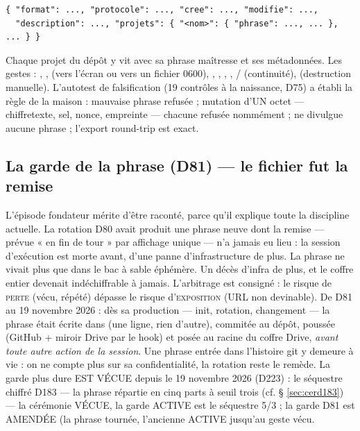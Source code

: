 \begin{lstlisting}
{ "format": ..., "protocole": ..., "cree": ..., "modifie": ...,
  "description": ..., "projets": { "<nom>": { "phrase": ..., ... }, ... } }
\end{lstlisting}

Chaque projet du dépôt y vit avec sa phrase maîtresse et ses métadonnées. Les gestes :
, ,  (vers l'écran ou vers un fichier 0600),
, , , ,
/ (continuité),  (destruction manuelle).
L'autotest de falsification (19 contrôles à la naissance, D75) a établi la règle de la
maison : mauvaise phrase refusée ; mutation d'UN octet — chiffretexte, sel, nonce,
empreinte — chacune refusée nommément ;  ne divulgue aucune phrase ;
l'export round-trip est exact.

\subsection{La garde de la phrase (D81) — le fichier fut la remise}\label{sec:guarded81}

L'épisode fondateur mérite d'être raconté, parce qu'il explique toute la discipline
actuelle. La rotation D80 avait produit une phrase neuve dont la remise — prévue « en
fin de tour » par affichage unique — n'a jamais eu lieu : la session d'exécution est
morte avant, d'une panne d'infrastructure de plus. La phrase ne vivait plus que dans le
bac à sable éphémère. Un décès d'infra de plus, et le coffre entier devenait
indéchiffrable à jamais. L'arbitrage est consigné : le risque de \textsc{perte} (vécu,
répété) dépasse le risque d'\textsc{exposition} (URL non devinable). De D81 au 19 novembre 2026 : dès sa
production — init, rotation, changement — la phrase était écrite dans
 (une ligne, rien d'autre), commitée au dépôt, poussée
(GitHub + miroir Drive par le hook) et posée au racine du coffre Drive, \emph{avant
toute autre action de la session}. Une phrase entrée dans l'histoire git y demeure à
vie : on ne compte plus sur sa confidentialité, la rotation reste le remède.
La garde plus dure EST VÉCUE depuis le 19 novembre 2026 (D223) : le
séquestre chiffré D183 — la phrase répartie en cinq parts à seuil trois
(cf. § \ref{sec:cerd183}) — la cérémonie VÉCUE, la garde ACTIVE est le
séquestre 5/3 ; la garde D81 est AMENDÉE (la phrase tournée, l'ancienne
ACTIVE jusqu'au geste vécu.

